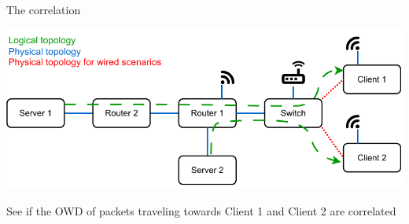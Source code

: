 \documentclass[presentation]{beamer}
\begin{document}
\begin{frame}[label={sec:org0ca37af}]{The correlation}
\begin{center}
\includegraphics[width=.9\linewidth]{figures/topology-wireless.drawio-1.pdf}
\end{center}

See if the OWD of packets traveling towards Client 1 and Client 2 are correlated
\end{frame}
\end{document}
